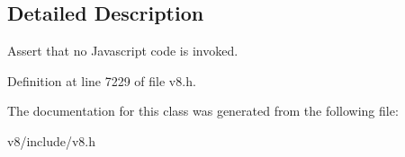 \subsection{Detailed Description}
Assert that no Javascript code is invoked. 

Definition at line 7229 of file v8.\+h.



The documentation for this class was generated from the following file\+:\begin{DoxyCompactItemize}
\item 
v8/include/v8.\+h\end{DoxyCompactItemize}
